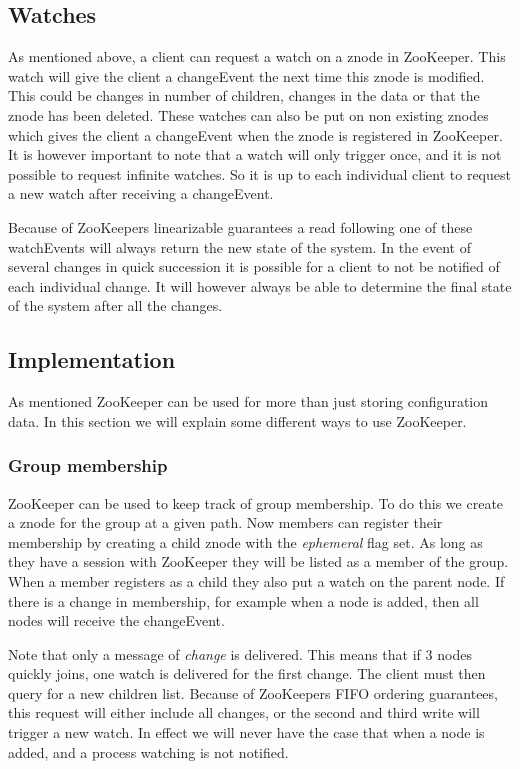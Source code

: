 \subsection{Watches}
As mentioned above, a client can request a watch on a znode in ZooKeeper. This watch will give the client a changeEvent the next time this znode is modified. This could be changes in number of children, changes in the data or that the znode has been deleted. These watches can also be put on non existing znodes which gives the client a changeEvent when the znode is registered in ZooKeeper. It is however important to note that a watch will only trigger once, and it is not possible to request infinite watches. So it is up to each individual client to request a new watch after receiving a changeEvent.

Because of ZooKeepers linearizable guarantees a read following one of these watchEvents will always return the new state of the system. In the event of several changes in quick succession it is possible for a client to not be notified of each individual change. It will however always be able to determine the final state of the system after all the changes.

\subsection{Implementation}

As mentioned ZooKeeper can be used for more than just storing configuration data. In this section we will explain some different ways to use ZooKeeper. 

\subsubsection{Group membership}
ZooKeeper can be used to keep track of group membership. To do this we create a znode for the group at a given path. Now members can register their membership by creating a child znode with the \emph{ephemeral} flag set. As long as they have a session with ZooKeeper they will be listed as a member of the group. When a member registers as a child they also put a watch on the parent node. If there is a change in membership, for example when a node is added, then all nodes will receive the changeEvent.

Note that only a message of \emph{change} is delivered. This means that if 3 nodes quickly joins, one watch is delivered for the first change. The client must then query for a new children list. Because of ZooKeepers FIFO ordering guarantees, this request will either include all changes, or the second and third write will trigger a new watch. In effect we will never have the case that when a node is added, and a process watching is not notified. 

